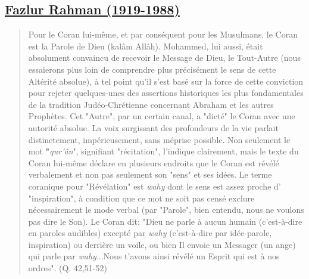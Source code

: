 \hypertarget{fazlur-rahman-1919-1988}{%
\subsection{\texorpdfstring{\underline{Fazlur Rahman
(1919-1988)}}{Fazlur Rahman (1919-1988)}}\label{fazlur-rahman-1919-1988}}

\begin{quote}
Pour le Coran lui-même, et par conséquent pour les Musulmans, le Coran
est la Parole de Dieu (kalâm Allâh). Mohammed, lui aussi, était
absolument convaincu de recevoir le Message de Dieu, le Tout-Autre (nous
essaierons plus loin de comprendre plus précisément le sens de cette
Altérité absolue), à tel point qu'il s'est basé sur la force de cette
conviction pour rejeter quelques-unes des assertions historiques les
plus fondamentales de la tradition Judéo-Chrétienne concernant Abraham
et les autres Prophètes. Cet "Autre", par un certain canal, a "dicté" le
Coran avec une autorité absolue. La voix surgissant des profondeurs de
la vie parlait distinctement, impérieusement, sans méprise possible. Non
seulement le mot \textbf{"}\emph{qur'ân}", signifiant "récitation",
l'indique clairement, mais le texte du Coran lui-même déclare en
plusieurs endroits que le Coran est révélé verbalement et non pas
seulement son "sens" et ses idées. Le terme coranique pour "Révélation"
est \emph{wahy} dont le sens est assez proche d' "inspiration", à
condition que ce mot ne soit pas censé exclure nécessairement le mode
verbal (par "Parole", bien entendu, nous ne voulons pas dire le Son). Le
Coran dit: "Dieu ne parle à aucun humain (c'est-à-dire en paroles
audibles) excepté par \emph{wahy} (c'est-à-dire par idée-parole,
inspiration) ou derrière un voile, ou bien Il envoie un Messager (un
ange) qui parle par \emph{wahy}...Nous t'avons ainsi révélé un Esprit
qui est à nos ordres". (Q. 42,51-52)


\end{quote}
